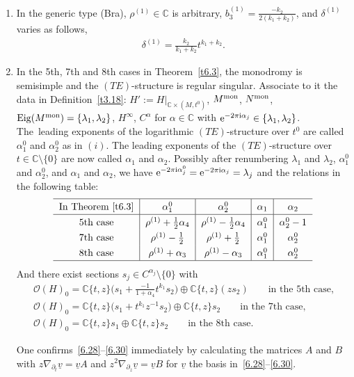 \documentclass[pdftex]{sigma}%
\numberwithin{equation}{section}
\numberwithin{figure}{section}
\newcommand{\C}{{\mathbb C}}
\newcommand{\OO}{{\mathcal O}}
\newcommand{\uuuu}{\underline}
\newcommand{\paa}{\partial}
\newcommand{\nnn}{\nabla}
\DeclareMathOperator{\Eig}{Eig}
\begin{document}
\begin{Remarks}
\begin{enumerate}
\item[$(iii)$] In the generic type (Bra), $\rho^{(1)}\in\C$ is arbitrary,
$b_3^{(1)}=\frac{-k_2}{2(k_1+k_2)}$, and $\delta^{(1)}$
varies as follows,
\begin{eqnarray}\label{6.26}
\delta^{(1)}= \frac{k_2}{k_1+k_2}t^{k_1+k_2}.
\end{eqnarray}

\item[$(iv)$] In the 5th, 7th and 8th cases in Theorem~\ref{t6.3},
the monodromy is semisimple and the $(TE)$-structure is regular singular.
Associate to it the data in Definition~\ref{t3.18}:
$H':=H|_{\C\times (M,t^0)}$, $M^{\rm mon}$, $N^{\rm mon}$,
$\Eig(M^{\rm mon})=\{\lambda_1,\lambda_2\}$, $H^\infty$, $C^{\alpha}$ for
$\alpha\in\C$ with ${\rm e}^{-2\pi {\rm i} \alpha_j}\in\{\lambda_1,\lambda_2\}$.
The~leading exponents of the logarithmic $(TE)$-structure
over $t^0$ are called $\alpha_1^0$ and $\alpha_2^0$ as in $(i)$.
The leading exponents of the $(TE)$-structure over
$t\in \C\setminus\{0\}$ are now called $\alpha_1$ and $\alpha_2$.
Possibly after renumbering $\lambda_1$ and $\lambda_2$,
$\alpha_1^0$ and $\alpha_2^0$, and $\alpha_1$ and $\alpha_2$,
we have ${\rm e}^{-2\pi {\rm i}\alpha_j^0}={\rm e}^{-2\pi {\rm i}\alpha_j}=\lambda_j$
and the relations in the following table:
\begin{gather}\label{6.27}
\def\arraystretch{1.3}
\begin{tabular}{c|c|c|c|c}
\hline
In Theorem~\ref{t6.3} & $\alpha_1^0$ & $\alpha_2^0$&$\alpha_1$ &$\alpha_2$
\\ \hline
5th case &$\rho^{(1)}+\frac{1}{2}\alpha_4$ &$\rho^{(1)}-\frac{1}{2}\alpha_4$
&$\alpha_1^0$ & $\alpha_2^0-1$
\\
7th case & $\rho^{(1)}-\frac{1}{2}$ &
$\rho^{(1)}+\frac{1}{2}$ & $\alpha_1^0$ & $\alpha_2^0$
\\
8th case &$\rho^{(1)}+\alpha_3$ &$\rho^{(1)}-\alpha_3$ & $\alpha_1^0$ & $\alpha_2^0$
\\
\hline
\end{tabular}
\end{gather}
And there exist sections $s_j\in C^{\alpha_j}\setminus\{0\}$ with
\begin{gather}
\OO(H)_0= \C\{t,z\}\bigg(s_1+\frac{-1}{1+\alpha_4}t^{k_1}s_2\bigg)
\oplus \C\{t,z\}(zs_2)
\qquad \text{in the 5th case,} \label{6.28}\\
\OO(H)_0= \C\{t,z\}\big(s_1+t^{k_1}z^{-1}s_2\big)
\oplus \C\{t,z\}s_2
\qquad \text{in the 7th case,} \label{6.29}\\[.5ex]
\OO(H)_0= \C\{t,z\}s_1
\oplus \C\{t,z\}s_2
\qquad \text{in the 8th case.}\label{6.30}
\end{gather}
{\sloppy
One confirms~\eqref{6.28}--\eqref{6.30}
immediately by calculating the matrices
$A$ and $B$ with \mbox{$z\nnn_{\paa_t}\uuuu{v}=\uuuu{v}A$}
and $z^2\nnn_{\paa_z}\uuuu{v}=\uuuu{v}B$ for
$\uuuu{v}$ the basis in~\eqref{6.28}--\eqref{6.30}.

}
\end{enumerate}
\end{Remarks}
\end{document}
